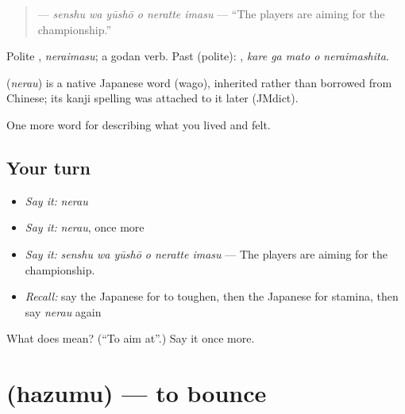 \begin{quote}
\textbf{  } — \emph{senshu wa yūshō o neratte imasu} — \textquotedblleft{}The players are aiming for the championship.\textquotedblright{}
\end{quote}

Polite \textbf{}, \emph{neraimasu}; a godan verb. Past (polite): \textbf{  }, \emph{kare ga mato o neraimashita}.

\begin{cousinweb}
\textbf{} (\emph{nerau}) is a native Japanese word (wago), inherited rather than borrowed from Chinese; its kanji spelling was attached to it later (JMdict).
\end{cousinweb}

\begin{grammarlens}[title={What you've built}]
One more word for describing what you lived and felt.
\end{grammarlens}

\subsection*{Your turn}
\begin{itemize}
\raggedright
  \item \emph{Say it:} \emph{nerau}
  \item \emph{Say it:} \emph{nerau}, once more
  \item \emph{Say it:} \emph{senshu wa yūshō o neratte imasu} — The players are aiming for the championship.
  \item \emph{Recall:} say the Japanese for to toughen, then the Japanese for stamina, then say \emph{nerau} again
\end{itemize}

\begin{tcolorbox}[breakable,colback=teal!4,colframe=teal!35!black,title={Before you move on}]
What does  mean? (\textquotedblleft{}To aim at\textquotedblright{}.) Say it once more.
\end{tcolorbox}
\section[\texorpdfstring{\ja{はずむ} (hazumu)}{はずむ (hazumu)}]{ (hazumu) — to bounce}

\label{lesson:JA-C463-hazumu}



